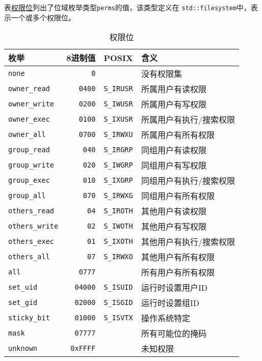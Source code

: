 表\hyperref[t20.14]{权限位}列出了位域枚举类型\texttt{perms}的值，该类型定义在
\texttt{std::filesystem}中，表示一个或多个权限位。
\begin{table}[ht]
    \centering
    \begin{tabular}{l|r|l|l}
        \hline
        \textbf{枚举}            & \textbf{8进制值}   & \textbf{POSIX}    & \textbf{含义}  \\
        \hline
        \texttt{none}          & \texttt{0}      &                   & 没有权限集        \\
        \texttt{owner\_read}   & \texttt{0400}   & \texttt{S\_IRUSR} & 所属用户有读权限     \\
        \texttt{owner\_write}  & \texttt{0200}   & \texttt{S\_IWUSR} & 所属用户有写权限     \\
        \texttt{owner\_exec}   & \texttt{0100}   & \texttt{S\_IXUSR} & 所属用户有执行/搜索权限 \\
        \texttt{owner\_all}    & \texttt{0700}   & \texttt{S\_IRWXU} & 所属用户有所有权限    \\
        \texttt{group\_read}   & \texttt{040}    & \texttt{S\_IRGRP} & 同组用户有读权限     \\
        \texttt{group\_write}  & \texttt{020}    & \texttt{S\_IWGRP} & 同组用户有写权限     \\
        \texttt{group\_exec}   & \texttt{010}    & \texttt{S\_IXGRP} & 同组用户有执行/搜索权限 \\
        \texttt{group\_all}    & \texttt{070}    & \texttt{S\_IRWXG} & 同组用户有所有权限    \\
        \texttt{others\_read}  & \texttt{04}     & \texttt{S\_IROTH} & 其他用户有读权限     \\
        \texttt{others\_write} & \texttt{02}     & \texttt{S\_IWOTH} & 其他用户有写权限     \\
        \texttt{others\_exec}  & \texttt{01}     & \texttt{S\_IXOTH} & 其他用户有执行/搜索权限 \\
        \texttt{others\_all}   & \texttt{07}     & \texttt{S\_IRWXO} & 其他用户有所有权限    \\
        \texttt{all}           & \texttt{0777}   &                   & 所有用户有所有权限    \\
        \texttt{set\_uid}      & \texttt{04000}  & \texttt{S\_ISUID} & 运行时设置用户ID    \\
        \texttt{set\_gid}      & \texttt{02000}  & \texttt{S\_ISGID} & 运行时设置组ID     \\
        \texttt{sticky\_bit}   & \texttt{01000}  & \texttt{S\_ISVTX} & 操作系统特定       \\
        \texttt{mask}          & \texttt{07777}  &                   & 所有可能位的掩码     \\
        \texttt{unknown}       & \texttt{0xFFFF} &                   & 未知权限         \\
        \hline
    \end{tabular}
    \caption{权限位}
    \label{t20.14}
\end{table}

